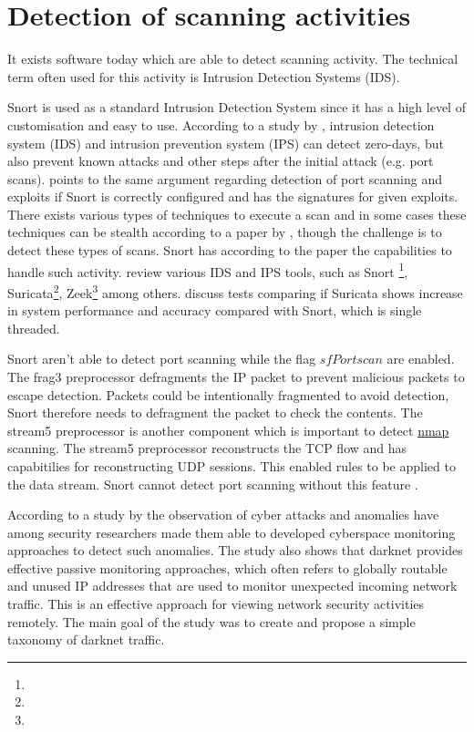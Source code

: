 \section{Detection of scanning activities}
\label{s:ScanningDetection}
It exists software today which are able to detect scanning activity. The technical term often used for this activity is Intrusion Detection Systems (IDS).

Snort is used as a standard Intrusion Detection System since it has a high level of customisation and easy to use. According to a study by \textcite{chumachenko2017study}, intrusion detection system (IDS) and intrusion prevention system (IPS) can detect zero-days, but also prevent known attacks and other steps after the initial attack (e.g. port scans).
\textcite{jammes2013snort} points to the same argument regarding detection of port scanning and exploits if Snort is correctly configured and has the signatures for given exploits.
There exists various types of techniques to execute a scan and in some cases these techniques can be stealth according to a paper by \textcite{8082680}, though the challenge is to detect these types of scans. Snort has according to the paper the capabilities to handle such activity.
\textcite{thapa2020role} review various IDS and IPS tools, such as Snort
\footnote{}, Suricata\footnote{},
Zeek\footnote{} among others.
\textcite{day2011performance} discuss tests comparing if Suricata shows increase in system performance and accuracy compared with Snort, which is single threaded.

Snort aren't able to detect port scanning while the flag $sfPortscan$ are enabled. The frag3 preprocessor defragments the IP packet to prevent malicious packets to escape detection. Packets could be intentionally fragmented to avoid detection, Snort therefore needs to defragment the packet to check the contents. The stream5 preprocessor is another component which is important to detect \hyperref[s:HowNmapWorks]{nmap} scanning. The stream5 preprocessor reconstructs the TCP flow and has capabitilies for reconstructing UDP sessions. This enabled rules to be applied to the data stream. Snort cannot detect port scanning without this feature \autocite{jammes2013snort}.

According to a study by \textcite{Liu2018} the observation of cyber attacks and anomalies have among security researchers made them able to developed cyberspace monitoring approaches to detect such anomalies.
The study also shows that darknet provides effective passive monitoring approaches, which often refers to globally routable and unused IP addresses that are used to monitor unexpected incoming network traffic. This is an effective approach for viewing network security activities remotely.
The main goal of the study was to create and propose a simple taxonomy of darknet traffic.


